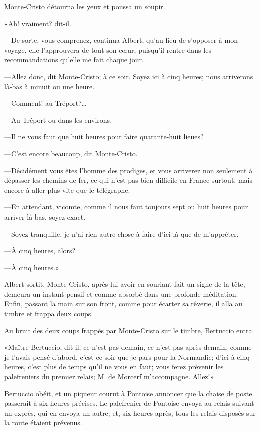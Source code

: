 Monte-Cristo détourna les yeux et poussa un soupir. 

«Ah! vraiment? dit-il. 

—De sorte, vous comprenez, continua Albert, qu'au lieu de s'opposer à mon voyage, elle l'approuvera de tout son cœur, puisqu'il rentre dans les recommandations qu'elle me fait chaque jour. 

—Allez donc, dit Monte-Cristo; à ce soir. Soyez ici à cinq heures; nous arriverons là-bas à minuit ou une heure. 

—Comment! au Tréport?\dots 

—Au Tréport ou dans les environs. 

—Il ne vous faut que huit heures pour faire quarante-huit lieues? 

—C'est encore beaucoup, dit Monte-Cristo. 

—Décidément vous êtes l'homme des prodiges, et vous arriverez non seulement à dépasser les chemins de fer, ce qui n'est pas bien difficile en France surtout, mais encore à aller plus vite que le télégraphe. 

—En attendant, vicomte, comme il nous faut toujours sept ou huit heures pour arriver là-bas, soyez exact. 

—Soyez tranquille, je n'ai rien autre chose à faire d'ici là que de m'apprêter. 

—À cinq heures, alors? 

—À cinq heures.» 

Albert sortit. Monte-Cristo, après lui avoir en souriant fait un signe de la tête, demeura un instant pensif et comme absorbé dans une profonde méditation. Enfin, passant la main sur son front, comme pour écarter sa rêverie, il alla au timbre et frappa deux coups. 

Au bruit des deux coups frappés par Monte-Cristo sur le timbre, Bertuccio entra. 

«Maître Bertuccio, dit-il, ce n'est pas demain, ce n'est pas après-demain, comme je l'avais pensé d'abord, c'est ce soir que je pars pour la Normandie; d'ici à cinq heures, c'est plus de temps qu'il ne vous en faut; vous ferez prévenir les palefreniers du premier relais; M. de Morcerf m'accompagne. Allez!» 

Bertuccio obéit, et un piqueur courut à Pontoise annoncer que la chaise de poste passerait à six heures précises. Le palefrenier de Pontoise envoya au relais suivant un exprès, qui en envoya un autre; et, six heures après, tous les relais disposés sur la route étaient prévenus. 

